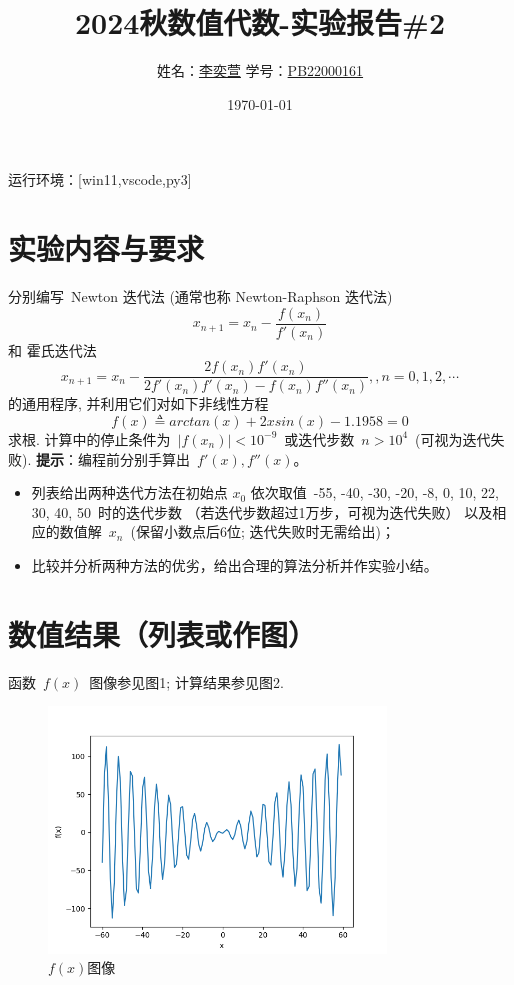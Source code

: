 \documentclass[10pt,a4paper,oneside]{article}
\begin{document}
\title{\huge{\textbf{2024秋数值代数-实验报告\#2}}}
\author{姓名：\underline{李奕萱} \hspace{1cm}学号：\underline{PB22000161} }
\date{\today}

\maketitle

运行环境：[win11,vscode,py3]

\section*{实验内容与要求}


分别编写~Newton 迭代法 (通常也称 Newton-Raphson 迭代法)
$$x_{n+1}=x_n-\frac{f(x_n)}{f'(x_n)}$$
和 %
霍氏迭代法
 $$x_{n+1}= x_n - \frac{2f(x_n)f'(x_n)}{2f'(x_n)f'(x_n) - f(x_n)f''(x_n)}, , n=0,1,2,\cdots$$
的通用程序, 并利用它们对如下非线性方程
$$ f(x)\triangleq{arctan(x)}+2xsin(x) - 1.1958 =0$$
求根. %
计算中的停止条件为~$|f(x_n)|<10^{-9}$~或迭代步数~$n>10^4$~(可视为迭代失败).
{\bf 提示}：编程前分别手算出~$f'(x), f''(x)$。

\begin{itemize}
    \item 列表给出两种迭代方法在初始点 $x_0$ 依次取值~-55, -40, -30, -20, -8, 0, 10, 22, 30, 40, 50~时的迭代步数
    （若迭代步数超过1万步，可视为迭代失败）
    以及相应的数值解~$x_n$~(保留小数点后6位; 迭代失败时无需给出)；
    \item 比较并分析两种方法的优劣，给出合理的算法分析并作实验小结。
\end{itemize}
\clearpage

\section{数值结果（列表或作图）}
函数~$f(x)$~图像参见图1; 计算结果参见图2.

\begin{figure}[H]
  \centering
  \caption{$f(x)$图像}
  \includegraphics[width=0.8\textwidth]{Figure_1.png}
\end{figure}
\end{document}

